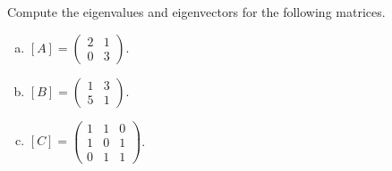 \documentclass[12pt]{article} %
\begin{document}
\newpage
\begin{problem}
    Compute the eigenvalues and eigenvectors for the following matrices.
\begin{enumerate}[(a)]
    \item $[A] = \begin{pmatrix} 2 & 1 \\ 0 & 3 \end{pmatrix}$.
    \item $[B] = \begin{pmatrix} 1 & 3 \\ 5 & 1 \end{pmatrix}$.
    \item $[C] = \begin{pmatrix} 1 & 1 & 0 \\ 1 & 0 & 1 \\ 0 & 1 & 1 \end{pmatrix}$.
\end{enumerate}
\end{problem}
\end{document}
